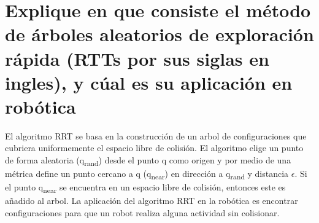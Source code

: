 \section{Explique en que consiste el método de árboles aleatorios de exploración rápida (RTTs por sus siglas en ingles), y cúal es su aplicación en robótica}
El algoritmo RRT se basa en la construcción de un arbol de configuraciones que cubriera uniformemente el espacio libre de colisión. El algoritmo elige un punto de forma aleatoria (q\textsubscript{rand}) desde el punto q como origen y por medio de una métrica define un punto cercano a q (q\textsubscript{near}) en dirección a q\textsubscript{rand} y distancia $\epsilon$. Si el punto q\textsubscript{near} se encuentra en un espacio libre de colisión, entonces este es añadido al arbol. La aplicación del algoritmo RRT en la robótica es encontrar configuraciones para que un robot realiza alguna actividad sin colisionar.